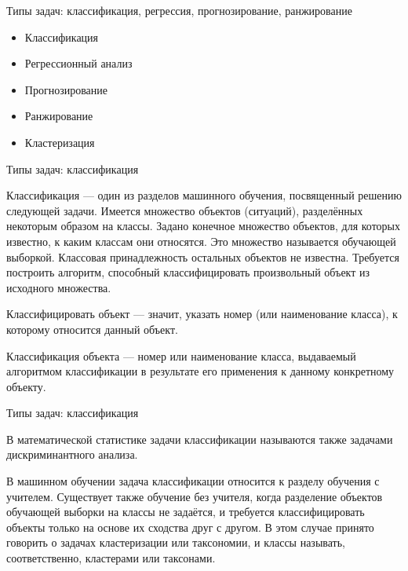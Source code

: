 \documentclass{beamer}
\begin{document}
\begin{frame}{Типы задач: классификация, регрессия, прогнозирование, ранжирование}

\begin{itemize}
  \item  Классификация
  \item  Регрессионный анализ
  \item  Прогнозирование
  \item  Ранжирование
  \item  Кластеризация 
\end{itemize}

\end{frame}
 

\begin{frame}{Типы задач: классификация}


Классификация — один из разделов машинного обучения, посвященный решению 
следующей задачи. Имеется множество объектов (ситуаций), разделённых некоторым образом на классы. 
Задано конечное множество объектов, для которых известно, к каким классам они относятся. 
Это множество называется обучающей выборкой. Классовая принадлежность остальных 
объектов не известна. Требуется построить алгоритм, способный классифицировать 
произвольный объект из исходного множества.

Классифицировать объект — значит, указать номер (или наименование класса), к которому относится данный объект.

Классификация объекта — номер или наименование класса, выдаваемый алгоритмом 
классификации в результате его применения к данному конкретному объекту.
\end{frame}
 

\begin{frame}{Типы задач: классификация}

В математической статистике задачи классификации называются также задачами дискриминантного анализа.

В машинном обучении задача классификации относится к разделу обучения с учителем. 
Существует также обучение без учителя, когда разделение объектов обучающей выборки на классы не задаётся, 
и требуется классифицировать объекты только на основе их сходства друг с другом. 
В этом случае принято говорить о задачах кластеризации или таксономии, и классы называть, 
соответственно, кластерами или таксонами. 



\end{frame}
\end{document}
